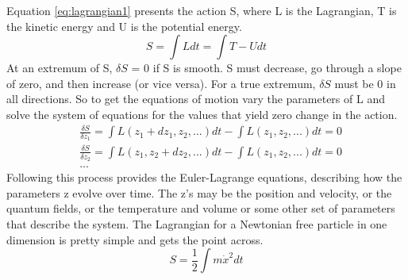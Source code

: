 \documentclass[12pt]{article}
\begin{document}
Equation \ref{eq:lagrangian1} presents the action S, where L is the Lagrangian, T is the kinetic energy and U is the potential energy.     
\begin{equation}
\label{eq:lagrangian1}
S = \int L dt = \int T - U dt
\end{equation}
At an extremum of S, $\delta S$ = 0 if S is smooth. S must decrease, go through a slope of zero, and then increase (or vice versa). For a true extremum, $\delta S$ must be 0 in all directions. So to get the equations of motion vary the parameters of L and solve the system of equations for the values that yield zero change in the action.
\begin{equation}
\begin{split}
&\frac{\delta S}{\delta z_1} = \int L(z_1 + dz_1, z_2, ...)dt - \int L(z_1, z_2, ...)dt = 0 \\
&\frac{\delta S}{\delta z_2} = \int L(z_1, z_2 + dz_2, ...)dt - \int L(z_1, z_2, ...)dt = 0 \\
&...
\end{split}
\end{equation}
Following this process provides the Euler-Lagrange equations, describing how the parameters z evolve over time. The z's may be the position and velocity, or the quantum fields, or the temperature and volume or some other set of parameters that describe the system. The Lagrangian for a Newtonian free particle in one dimension is pretty simple and gets the point across. 
\begin{equation}
S = \frac{1}{2} \int m\dot{x}^2 dt
\end{equation}
\end{document}
